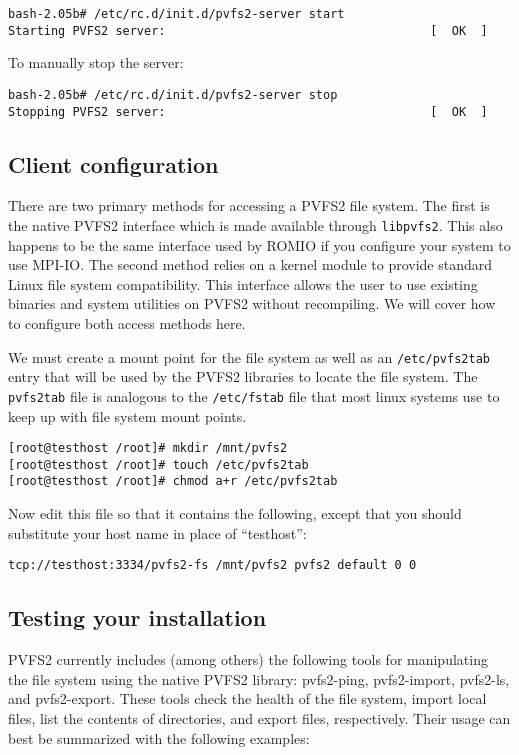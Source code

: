 \documentclass[11pt, letterpaper]{article}
\begin{document}
\begin{verbatim}
bash-2.05b# /etc/rc.d/init.d/pvfs2-server start
Starting PVFS2 server:                                     [  OK  ]
\end{verbatim}

To manually stop the server:

\begin{verbatim}
bash-2.05b# /etc/rc.d/init.d/pvfs2-server stop
Stopping PVFS2 server:                                     [  OK  ]
\end{verbatim}

\subsection{Client configuration}
\label{subsec:client}

There are two primary methods for accessing a PVFS2 file system.  The
first is the native PVFS2 interface which is made available
through {\tt libpvfs2}.  This also happens to be the same interface used by
ROMIO if you configure your system to use MPI-IO.  The second method
relies on a kernel module to provide standard Linux file system
compatibility.  This interface allows the user to use existing
binaries and system utilities on PVFS2 without recompiling.  We will
cover how to configure both access methods here.

We must create a mount point for the file system as well as
an {\tt /etc/pvfs2tab} entry that will be used by
the PVFS2 libraries to locate the file system.  The {\tt pvfs2tab} file is
analogous to the {\tt /etc/fstab} file that most linux systems use to keep up
with file system mount points.

\begin{verbatim}
[root@testhost /root]# mkdir /mnt/pvfs2
[root@testhost /root]# touch /etc/pvfs2tab
[root@testhost /root]# chmod a+r /etc/pvfs2tab
\end{verbatim}

Now edit this file so that it contains the following, except that you should
substitute your host name in place of ``testhost'':

\begin{verbatim}
tcp://testhost:3334/pvfs2-fs /mnt/pvfs2 pvfs2 default 0 0 
\end{verbatim}

\subsection{Testing your installation}
\label{subsec:testing}
PVFS2 currently includes (among others) the following tools for
manipulating the file system using the native PVFS2 library: pvfs2-ping,
pvfs2-import, pvfs2-ls, and pvfs2-export.  These tools check the health
of the file system, import local files, list the contents of directories,
and export files, respectively.  Their usage can best be summarized with
the following examples:
\end{document}
